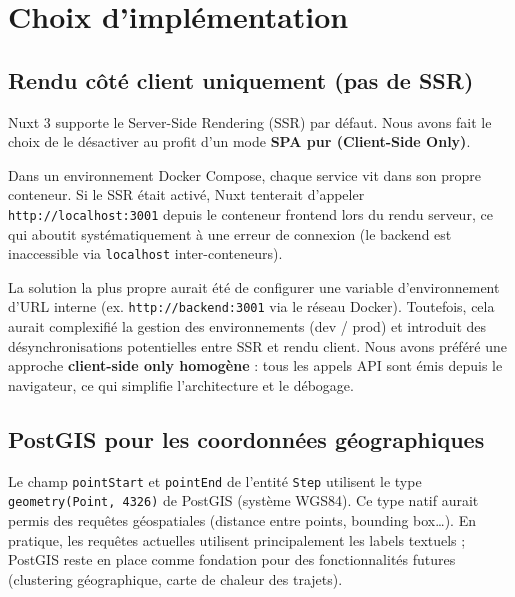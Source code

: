 \documentclass[11pt,a4paper]{article}
\begin{document}
\newpage
\section{Choix d'implémentation}

\subsection{Rendu côté client uniquement (pas de SSR)}
\label{sec:ssr}

Nuxt 3 supporte le Server-Side Rendering (SSR) par défaut. Nous avons fait le choix de le désactiver au profit d'un mode \textbf{SPA pur (Client-Side Only)}.

\begin{warnbox}[title={Problème rencontré}]
Dans un environnement Docker Compose, chaque service vit dans son propre conteneur. Si le SSR était activé, Nuxt tenterait d'appeler \texttt{http://localhost:3001} depuis le conteneur frontend lors du rendu serveur, ce qui aboutit systématiquement à une erreur de connexion (le backend est inaccessible via \texttt{localhost} inter-conteneurs).
\end{warnbox}

La solution la plus propre aurait été de configurer une variable d'environnement d'URL interne (ex. \texttt{http://backend:3001} via le réseau Docker). Toutefois, cela aurait complexifié la gestion des environnements (dev / prod) et introduit des désynchronisations potentielles entre SSR et rendu client. Nous avons préféré une approche \textbf{client-side only homogène} : tous les appels API sont émis depuis le navigateur, ce qui simplifie l'architecture et le débogage.

\subsection{PostGIS pour les coordonnées géographiques}

Le champ \texttt{pointStart} et \texttt{pointEnd} de l'entité \texttt{Step} utilisent le type \texttt{geometry(Point, 4326)} de PostGIS (système WGS84). Ce type natif aurait permis des requêtes géospatiales (distance entre points, bounding box…). En pratique, les requêtes actuelles utilisent principalement les labels textuels ; PostGIS reste en place comme fondation pour des fonctionnalités futures (clustering géographique, carte de chaleur des trajets).
\end{document}
